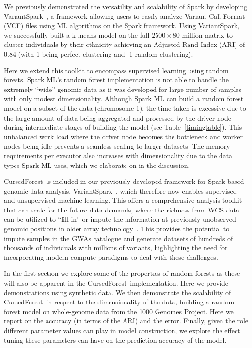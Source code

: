 \documentclass[10pt,letterpaper]{article}
\newcommand{\cursedforest}{{\sc CursedForest}}
\let\oldmarginpar\marginpar
\renewcommand\marginpar[1]{\-\oldmarginpar[\raggedleft\footnotesize #1]%
{\raggedright\footnotesize #1}}
\begin{document}
We previously demonstrated the versatility and scalability of Spark by developing VariantSpark~\cite{OBrien2015}, a
framework allowing users to easily analyze Variant Call Format (VCF) files using ML algorithms on the Spark framework.
Using VariantSpark, we successfully built a k-means model on the full $2500 \times 80$ million matrix to cluster
individuals by their ethnicity achieving an Adjusted Rand Index (ARI) of 0.84 (with 1 being perfect clustering and -1 random
clustering).

Here we extend this toolkit to encompass supervised learning using random forests.  Spark ML's random forest
implementation is not able to handle the extremely ``wide'' genomic data as it was developed for large number of samples
with only modest dimensionality.  Although Spark ML can build a random forest model on a subset of the data (chromosome
1), the time taken is excessive due to the large amount of data being aggregated and processed by the driver node
during intermediate stages of building the model (see Table~\ref{timingtable}). 
\marginpar{missing ref}
 This unbalanced work load where the driver node becomes the bottleneck and worker
nodes being idle prevents a seamless scaling to larger datasets. The memory requirements per executor also increases
with dimensionality due to the data types Spark ML uses, which we elaborate on in the discussion.


\cursedforest\ is included in our previously developed framework for Spark-based genomic data analysis,
VariantSpark~\cite{OBrien2015}, which therefore now enables supervised and unsupervised machine learning. This offers a
comprehensive analysis toolkit that can scale for the future data demands, where the richness from WGS data can be
utilized to ``fill in'' or impute the information at previously unobserved genomic positions in older array
technology~\cite{Howie2012}.  This provides the potential to impute samples in the GWAs catalogue and generate datasets
of hundreds of thousands of individuals with millions of variants, highlighting the need for incorporating modern
compute paradigms to deal with these challenges.


In the first section we explore some of the properties of random forests as these will also be apparent in the \cursedforest\
implementation. Here we provide demonstrations using synthetic data.  We then demonstrate the scalability of
\cursedforest\ in respect to the dimensionality of the data, building a random forest model on whole-genome data from
the 1000 Genomes Project. Here we report on the accuracy (in terms of the ARI) and the error.  Finally, given the role
different parameter values can play in model construction, we explore the effect tuning these parameters can have on the
prediction accuracy of the model.
\end{document}
